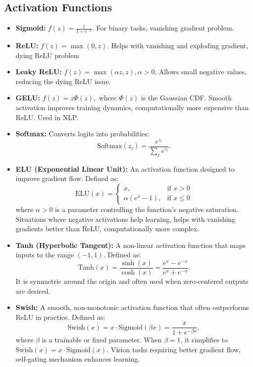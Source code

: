 \documentclass[12pt,a4paper]{article}
\begin{document}
\subsection{Activation Functions}
\begin{itemize}
    \item \textbf{Sigmoid:} \( f(z) = \frac{1}{1 + e^{-z}} \). For binary tasks, vanishing gradient problem.
    \item \textbf{ReLU:} \( f(z) = \max(0, z) \). Helps with vanishing and exploding gradient, dying ReLU problem
    \item \textbf{Leaky ReLU:} \( f(z) = \max(\alpha z, z), \alpha > 0 \). Allows small negative values, reducing the dying ReLU issue.
    \item \textbf{GELU:} \( f(z) = z \Phi(z), \) where \( \Phi(z) \) is the Gaussian CDF. Smooth activation improves training dynamics, computationally more expensive than ReLU. Used in NLP.
    \item \textbf{Softmax:} Converts logits into probabilities:
    \[ \text{Softmax}(z_i) = \frac{e^{z_i}}{\sum_{j} e^{z_j}}. \]
\item \textbf{ELU (Exponential Linear Unit):} An activation function designed to improve gradient flow. Defined as:
    \[
    \text{ELU}(x) = 
    \begin{cases} 
    x, & \text{if } x > 0 \\
    \alpha (e^x - 1), & \text{if } x \leq 0 
    \end{cases}
    \]
    where \(\alpha > 0\) is a parameter controlling the function's negative saturation. Situations where negative activations help learning, helps with vanishing gradients better than ReLU, computationally more complex.
\item \textbf{Tanh (Hyperbolic Tangent):} A non-linear activation function that maps inputs to the range \((-1, 1)\). Defined as:
    \[
    \text{Tanh}(x) = \frac{\sinh(x)}{\cosh(x)} = \frac{e^x - e^{-x}}{e^x + e^{-x}}.
    \]
    It is symmetric around the origin and often used when zero-centered outputs are desired.
\item \textbf{Swish:} A smooth, non-monotonic activation function that often outperforms ReLU in practice. Defined as:
    \[
    \text{Swish}(x) = x \cdot \text{Sigmoid}(\beta x) = \frac{x}{1 + e^{-\beta x}},
    \]
    where \(\beta\) is a trainable or fixed parameter. When \(\beta = 1\), it simplifies to \(\text{Swish}(x) = x \cdot \text{Sigmoid}(x)\). Vision tasks requiring better gradient flow, self-gating mechanism enhances learning.
\end{itemize}
\end{document}
